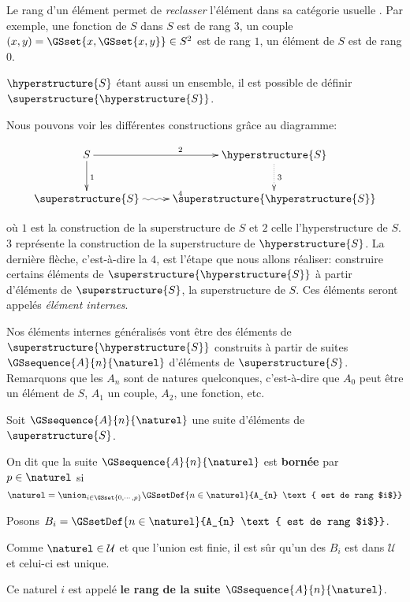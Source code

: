 Le rang d'un élément permet de \textit{reclasser} l'élément dans sa catégorie
\og usuelle \fg. Par exemple, une fonction de $S$ dans $S$ est de rang $3$, un couple
$(x, y) = \GSset{x, \GSset{x, y} } \in S^{2}$ est de rang $1$, un élément de $S$
est de rang $0$.

$\hyperstructure{S}$ étant aussi un ensemble, il est possible de définir
$\superstructure{\hyperstructure{S}}$.

Nous pouvons voir les différentes constructions grâce au diagramme:

\begin{displaymath}
	\xymatrix{ S \ar[d]^{1} \ar[r]^{2} & \hyperstructure{S} \ar@{.>}[d]^{3} \\
	\superstructure{S} \ar@{~>}[r]^{4} & \superstructure{\hyperstructure{S}}}
\end{displaymath}

où $1$ est la construction de la superstructure de $S$ et $2$ celle
l'hyperstructure de $S$.
$3$ représente la construction de la superstructure de $\hyperstructure{S}$. La
dernière flèche, c'est-à-dire la $4$, est l'étape que nous allons réaliser:
construire certains éléments de $\superstructure{\hyperstructure{S}}$ à partir
d'éléments de $\superstructure{S}$, la superstructure de $S$. Ces éléments
seront appelés \textit{élément internes}.

Nos éléments internes \og généralisés \fg vont être des éléments de
$\superstructure{\hyperstructure{S}}$ construits à partir de suites
$\GSsequence{A}{n}{\naturel}$ d'éléments de $\superstructure{S}$. Remarquons que
les $A_{n}$ sont de natures quelconques, c'est-à-dire que $A_{0}$ peut être un
élément de $S$, $A_{1}$ un couple, $A_{2}$, une fonction, etc.


\begin{definition} 
	Soit $\GSsequence{A}{n}{\naturel}$ une suite d'éléments de $\superstructure{S}$.

	On dit que la suite $\GSsequence{A}{n}{\naturel}$ est \textbf{bornée} par $p
	\in \naturel$ si
	\begin{equation}
		\naturel = \union_{i \in \GSset{0, \cdots, p}} \GSsetDef{n
		\in \naturel}{A_{n} \text{ est de rang $i$}}
	\end{equation}

	Posons $B_{i} = \GSsetDef{n \in \naturel}{A_{n} \text{ est de rang $i$}}$.

	Comme $\naturel \in \mathcal{U}$ et que l'union est finie, il est sûr qu'un
	des $B_{i}$ est dans $\mathcal{U}$ et celui-ci est unique.

	Ce naturel $i$ est appelé \textbf{le rang de la suite
		$\GSsequence{A}{n}{\naturel}$}.
\end{definition}

